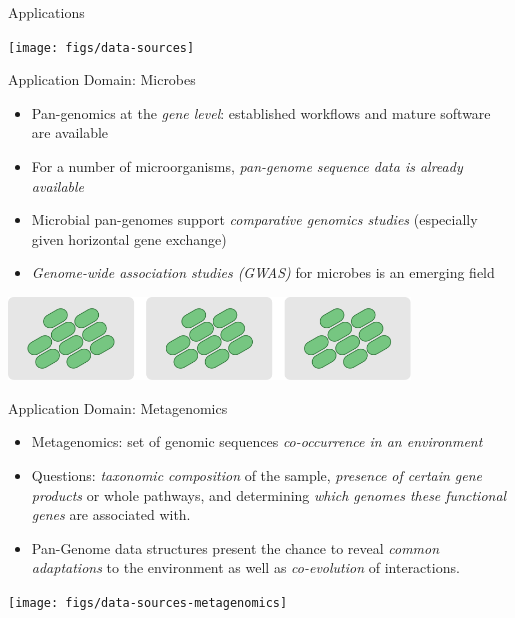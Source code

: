 \documentclass[notes=hide]{beamer}
\newcommand{\0}{\ensuremath{\mathtt{0}}}
\newcommand{\1}{\ensuremath{\mathtt{1}}}
\begin{document}
\begin{frame}{Applications}
\begin{center}
\texttt{[image: figs/data-sources]}
\end{center}
\end{frame}


\begin{frame}{Application Domain: Microbes}
\begin{itemize}
 \item Pan-genomics at the \emph{gene level}: established workflows and mature software are available
 \item For a number of microorganisms, \emph{pan-genome sequence data is already available}
 \item Microbial pan-genomes support \emph{comparative genomics studies} (especially given horizontal gene exchange)
 \item \emph{Genome-wide association studies (GWAS)} for microbes is an emerging field
\end{itemize}
\begin{center}
\includegraphics[width=0.8\textwidth]{figs/data-sources-bacteria}
\end{center}
\end{frame}

\begin{frame}{Application Domain: Metagenomics}
\begin{itemize}
 \item Metagenomics: set of genomic sequences \emph{co-occurrence in an environment}
 \item Questions: \emph{taxonomic composition} of the sample, \emph{presence of certain gene products} or whole pathways, and determining \emph{which genomes these functional genes} are associated with.
 \item Pan-Genome data structures present the chance to reveal \emph{common adaptations} to the environment as well as \emph{co-evolution} of interactions.
\end{itemize}
\begin{center}
\texttt{[image: figs/data-sources-metagenomics]}
\end{center}
\end{frame}
\end{document}
